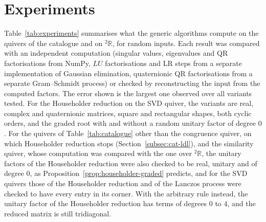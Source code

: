 \documentclass[12pt, a4paper]{report}
\theoremstyle{plain}
\theoremstyle{definition}
\theoremstyle{remark}
\theoremstyle{plain}
\newcommand{\twoR}{{}^{2}\mathbb{R}}
\begin{document}
\section{Experiments}
\label{sec:impl-experiments}
Table~\ref{tab:experiments} summarises what the generic algorithms compute on the quivers of the catalogue and on $\twoR$, for random inputs. Each result was compared with an independent computation (singular values, eigenvalues and QR factorisations from NumPy, $LU$ factorisations and LR steps from a separate implementation of Gaussian elimination, quaternionic QR factorisations from a separate Gram--Schmidt process) or checked by reconstructing the input from the computed factors. The error shown is the largest one observed over all variants tested. For the Householder reduction on the SVD quiver, the variants are real, complex and quaternionic matrices, square and rectangular shapes, both cyclic orders, and the graded root with and without a random unitary factor of degree $0$. For the quivers of Table~\ref{tab:catalogue} other than the congruence quiver, on which Householder reduction stops (Section~\ref{subsec:cat-ldl}), and the similarity quiver, whose computation was compared with the one over $\twoR$, the unitary factors of the Householder reduction were also checked to be real, unitary and of degree $0$, as Proposition~\ref{prop:householder-graded} predicts, and for the SVD quivers those of the Householder reduction and of the Lanczos process were checked to have every entry in its corner. With the arbitrary rule instead, the unitary factor of the Householder reduction has terms of degrees $0$ to $4$, and the reduced matrix is still tridiagonal.
\end{document}
